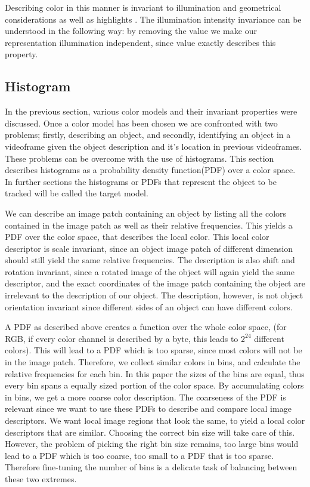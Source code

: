 \documentclass[a4paper,11pt]{article}
\begin{document}
Describing color in this manner is invariant to illumination and geometrical considerations as well as highlights \cite{gevers_invariant}. The illumination intensity invariance can be understood in the following way: by removing the value we make our representation illumination independent, since value exactly describes this property.

		 

\subsection{Histogram}

In the previous section, various color models and their invariant properties were discussed. Once a color model has been chosen we are confronted with two problems; firstly, describing an object, and secondly, identifying an object in a videoframe given the object description and it's location in previous videoframes. These problems can be overcome with the use of histograms. This section describes histograms as a probability density function(PDF) over a color space. In further sections the histograms or PDFs that represent the object to be tracked will be called the target model.



We can describe an image patch containing an object by listing all the colors contained in the image patch as well as their relative frequencies. This yields a PDF over the color space, that describes the local color. This local color descriptor is scale invariant, since an object image patch of different dimension should still yield the same relative frequencies. The description is also shift and rotation invariant, since a rotated image of the object will again yield the same descriptor, and the exact coordinates of the image patch containing the object are irrelevant to the description of our object. The description, however, is not object orientation invariant since different sides of an object can have different colors. 



A PDF as described above creates a function over the whole color space, (for RGB, if every color channel is described by a byte, this leads to $2^{24}$ different colors). This will lead to a PDF which is too sparse, since most colors will not be in the image patch. Therefore, we collect similar colors in bins, and calculate the relative frequencies for each bin. In this paper the sizes of the bins are equal, thus every bin spans a equally sized portion of the color space. By accumulating colors in bins, we get a more coarse color description. The coarseness of the PDF is relevant since we want to use these PDFs to describe and compare local image descriptors. We want local image regions that look the same, to yield a local color descriptors that are similar.  Choosing the correct bin size will take care of this. However, the problem of picking the right bin size remains, too large bins would lead to a PDF which is too coarse, too small to a PDF that is too sparse. Therefore fine-tuning the number of bins is a delicate task of balancing between these two extremes. 
\end{document}
